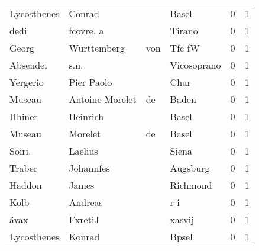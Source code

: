 \begin{center}
\begin{tiny}
\begin{longtabu}{llllrr}
              Lycosthenes &                             Conrad &             &                                       Basel &          0 &         1 \\
                     dedi &                          fcovre. a &             &                                      Tirano &          0 &         1 \\
                    Georg &                        Württemberg &         von &                                      Tfc fW &          0 &         1 \\
                 Absendei &                               s.n. &             &                                 Vicosoprano &          0 &         1 \\
                 Yergerio &                         Pier Paolo &             &                                        Chur &          0 &         1 \\
                   Museau &                    Antoine Morelet &          de &                                       Baden &          0 &         1 \\
                   Hhiner &                           Heinrich &             &                                       Basel &          0 &         1 \\
                   Museau &                            Morelet &          de &                                       Basel &          0 &         1 \\
                   Soiri. &                            Laelius &             &                                       Siena &          0 &         1 \\
                   Traber &                          Johannfes &             &                                    Augsburg &          0 &         1 \\
                   Haddon &                              James &             &                                    Richmond &          0 &         1 \\
                     Kolb &                            Andreas &             &                                         r i &          0 &         1 \\
                     ävax &                            FxretiJ &             &                                      xasvij &          0 &         1 \\
              Lycosthenes &                             Konrad &             &                                       Bpsel &          0 &         1 \\

\end{longtabu}
\end{tiny}
\end{center}
